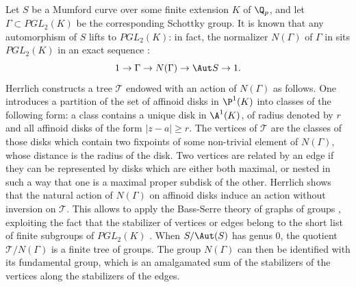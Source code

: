 \begin{para}\label{para::6.4.2} Let $S$ be a Mumford curve over some finite
 extension $K$ of $\Q_p$, and let $\Gamma 
 \subset PGL_2(K)$ be the corresponding Schottky group. It is known that
 any automorphism of $S$ lifts to $PGL_2(K)$: in fact, 
 the normalizer $N(\Gamma)$ of $\Gamma$ in sits $PGL_2(K)$ in an exact
 sequence \cite[IV]{sgamc}: 
\begin{equation*}
 1\to \Gamma\to N(\Gamma)\to  \Aut S\to 1.
\end{equation*} 
 \noindent Herrlich constructs a tree $\mathcal{T}$ endowed with an
 action of $N(\Gamma)$ as follows. One introduces a partition of the set
 of affinoid disks in $\P^1(K)$ into classes of the following form: a
 class contains a unique disk in $\A^1(K)$, of radius denoted by $r$ and
 all affinoid disks of the form $| z-a|\geq r$. The vertices of
 $\mathcal{T}$ are the classes of those disks which contain two fixpoints
 of some non-trivial element of $N(\Gamma)$, whose distance is the radius
 of the disk.  Two vertices are related by an edge if they can be
 represented by disks which are either both maximal, or nested in such a
 way that one is a maximal proper subdisk of the other. Herrlich shows
 that the natural action of $N(\Gamma)$ on affinoid disks induce an
 action without inversion on $\mathcal{T}$. This allows to apply the
 Bass-Serre theory of graphs of groups \cite{aas}, exploiting the fact
 that the stabilizer of vertices or edges belong to the short list of
 finite subgroups of $PGL_2(K)$
 \cite{herrlich80:_ordnun_autom_schot} \cite{herrlich80:_endlic_grupp}.
 When $S/\Aut(S)$ has genus $0$, the quotient $\mathcal{T}/N(\Gamma)$ is
 a finite tree of groups. The group $N(\Gamma)$ can then 
 be identified with its fundamental group, which is an amalgamated sum of
 the stabilizers of the vertices along the stabilizers of the edges.
\end{para}

